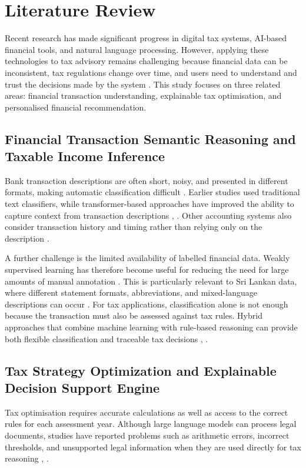 \documentclass[conference]{IEEEtran}
\begin{document}
\section{Literature Review}
Recent research has made significant progress in digital tax systems, AI-based financial tools, and natural language processing. However, applying these technologies to tax advisory remains challenging because financial data can be inconsistent, tax regulations change over time, and users need to understand and trust the decisions made by the system \cite{b1}. This study focuses on three related areas: financial transaction understanding, explainable tax optimisation, and personalised financial recommendation.

\subsection{Financial Transaction Semantic Reasoning and Taxable Income Inference}
Bank transaction descriptions are often short, noisy, and presented in different formats, making automatic classification difficult \cite{b8}. Earlier studies used traditional text classifiers, while transformer-based approaches have improved the ability to capture context from transaction descriptions \cite{b8}, \cite{b9}. Other accounting systems also consider transaction history and timing rather than relying only on the description \cite{b10}.

A further challenge is the limited availability of labelled financial data. Weakly supervised learning has therefore become useful for reducing the need for large amounts of manual annotation \cite{b11}. This is particularly relevant to Sri Lankan data, where different statement formats, abbreviations, and mixed-language descriptions can occur \cite{b1}. For tax applications, classification alone is not enough because the transaction must also be assessed against tax rules. Hybrid approaches that combine machine learning with rule-based reasoning can provide both flexible classification and traceable tax decisions \cite{b12}, \cite{b13}.

\subsection{Tax Strategy Optimization and Explainable Decision Support Engine}
Tax optimisation requires accurate calculations as well as access to the correct rules for each assessment year. Although large language models can process legal documents, studies have reported problems such as arithmetic errors, incorrect thresholds, and unsupported legal information when they are used directly for tax reasoning \cite{b14}, \cite{b15}.
\end{document}
